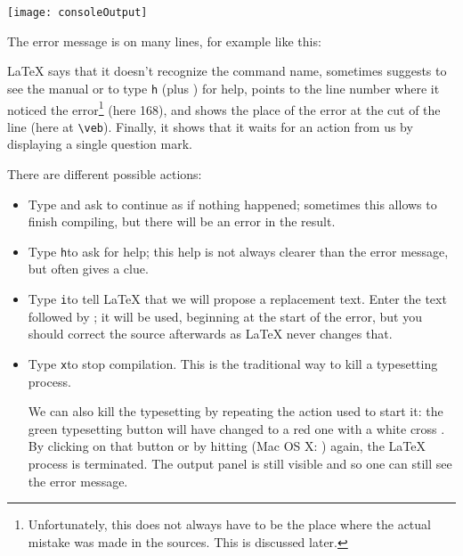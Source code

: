 \begin{center}\label{fig:consoleOutput}
\texttt{[image: consoleOutput]}
\end{center}

The error message is on many lines, for example like this:
\smallskip


{\LaTeX} says that it doesn't recognize the command name, sometimes suggests to see the manual or to type \verb|h| (plus \Return) for help, points to the line number where it noticed the error\footnote{Unfortunately, this does not always have to be the place where the actual mistake was made in the sources. This is discussed later.} (here 168), and shows the place of the error at the cut of the line (here at \verb|\veb|). Finally, it shows that it waits for an action from us by displaying a single question mark.

There are different possible actions:
\begin{itemize}
\item Type \Return and ask to continue as if nothing happened; sometimes this allows to finish compiling, but there will be an error in the result.
\item Type \verb+h+\Return to ask for help; this help is not always clearer than the error message, but often gives a clue.
\item Type \verb+i+\Return to tell {\LaTeX} that we will propose a replacement text. Enter the text followed by \Return; it will be used, beginning at the start of the error, but you should correct the source afterwards as {\LaTeX} never changes that.
\item Type \verb+x+\Return to stop compilation. This is the traditional {\AllTeX} way to kill a typesetting process.

We can also kill the typesetting by repeating the action used to start it: the green typesetting button will have changed to a red one with a white cross .
By clicking on that button or by hitting  (Mac OS X: ) again, the {\LaTeX} process is terminated. The output panel is still visible and so one can still see the error message.
\end{itemize}

